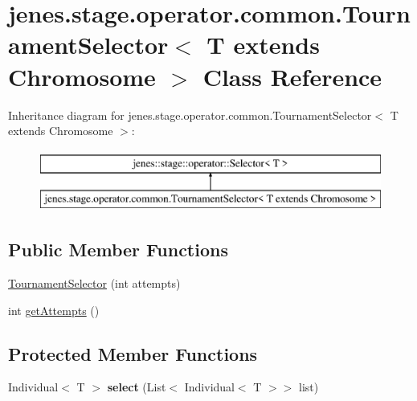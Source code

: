 \hypertarget{classjenes_1_1stage_1_1operator_1_1common_1_1_tournament_selector_3_01_t_01extends_01_chromosome_01_4}{\section{jenes.\-stage.\-operator.\-common.\-Tournament\-Selector$<$ T extends Chromosome $>$ Class Reference}
\label{classjenes_1_1stage_1_1operator_1_1common_1_1_tournament_selector_3_01_t_01extends_01_chromosome_01_4}
}
Inheritance diagram for jenes.\-stage.\-operator.\-common.\-Tournament\-Selector$<$ T extends Chromosome $>$\-:\begin{figure}[H]
\begin{center}
\leavevmode
\includegraphics[height=2.000000cm]{classjenes_1_1stage_1_1operator_1_1common_1_1_tournament_selector_3_01_t_01extends_01_chromosome_01_4}
\end{center}
\end{figure}
\subsection*{Public Member Functions}
\begin{DoxyCompactItemize}
\item 
\hyperlink{classjenes_1_1stage_1_1operator_1_1common_1_1_tournament_selector_3_01_t_01extends_01_chromosome_01_4_a69674739689660dc1926b06a43f2aa6d}{Tournament\-Selector} (int attempts)
\item 
int \hyperlink{classjenes_1_1stage_1_1operator_1_1common_1_1_tournament_selector_3_01_t_01extends_01_chromosome_01_4_a93a5d890bc7a8f383bda9791baf0460c}{get\-Attempts} ()
\end{DoxyCompactItemize}
\subsection*{Protected Member Functions}
\begin{DoxyCompactItemize}
\item 
\hypertarget{classjenes_1_1stage_1_1operator_1_1common_1_1_tournament_selector_3_01_t_01extends_01_chromosome_01_4_af18e34c3ad12626eb5d8540e05e9877e}{Individual$<$ T $>$ {\bfseries select} (List$<$ Individual$<$ T $>$$>$ list)}\label{classjenes_1_1stage_1_1operator_1_1common_1_1_tournament_selector_3_01_t_01extends_01_chromosome_01_4_af18e34c3ad12626eb5d8540e05e9877e}

\end{DoxyCompactItemize}


